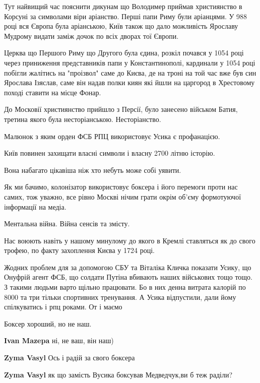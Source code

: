\begin{itemize}

Тут найвищий час пояснити дикунам що Володимер приймав християнство в Корсуні
за символами віри аріанство. Перші папи Риму були аріанцями. У 988 році вся
Європа була аріанською, Київ також що дало можливість Ярославу Мудрому видати
заміж дочок по всіх дворах тої Європи.

Церква що Першого Риму що Другого була єдина, розкіл почався у 1054 році через
приниження представників папи у Константинополі, кардинали у 1054 році побігли
жалітись на "проізвол" саме до Києва, де на троні на той час вже був син
Ярослава Ізяслав, саме він надав полки киян які йшли на царгород в Хрестовому
поході ставити на місце Фонар.

До Московії християнство прийшло з Персії, було занесено військом Батия,
третина якого була несторіанською. Несторіанство.

Малюнок з яким орден ФСБ РПЦ використовує Усика є профанацією.

Київ повинен захищати власні символи і власну 2700 літню історію.

Вона набагато цікавіша ніж хто небуть може собі уявити.

Як ми бачимо, колонізатор використовує боксера і його перемоги проти нас самих,
тож уважно, все рівно Москві нічим грати окрім об'єму формотуючої інформації на
медіа.

Ментальна війна. Війна сенсів та змісту.

Нас воюють навіть у нашому минулому до якого в Кремлі ставляться як до свого
трофею, по факту захоплення Києва у 1724 році.


Жодних проблем для за допомогою СБУ та Віталіка Кличка показати Усику, що
Онуфрій агент ФСБ, що солдати Путіна вбивають наших військових тощо тощо. З
такими людьми варто щільно працювати. Бо в них денна витрата калорій по 8000 та
три тільки спортивних тренування. А Усика відпустили, дали йому спілкуватись і
рпц роками. От і маємо

Боксер хороший, но не наш.

\begin{itemize} %
\textbf{Ivan Mazepa} ні, не ваш, він наш)

\textbf{Zyma Vasyl} Ось і радій за свого боксера

\textbf{Zyma Vasyl} як що замість Вусика боксував Медведчук,ви б теж раділи?
\end{itemize} %


\end{itemize}
